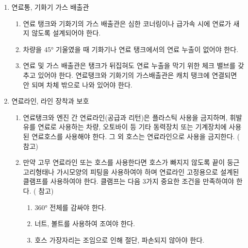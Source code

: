 \documentclass[final,a4paper,10pt]{report}
\begin{document}
\begin{enumerate}

  \item\label{rule:formula-technical.fuel-system.tank-and-carburetor-vent} 연료통, 기화기 가스 배출관
    \begin{enumerate}
      \item\label{rule:formula-technical.fuel-system.tank-and-carburetor-vent.leakproof-cornering-acceleration} 연료 탱크와 기화기의 가스 배출관은 심한 코너링이나 급가속 시에 연료가 새지 않도록 설계되어야 한다.
      \item\label{rule:formula-technical.fuel-system.tank-and-carburetor-vent.no-leak-45deg-tilt} 차량을 45° 기울였을 때 기화기나 연료 탱크에서의 연료 누출이 없어야 한다.
      \item\label{rule:formula-technical.fuel-system.tank-and-carburetor-vent.check-valve-and-routing} 연료 및 가스 배출관은 탱크가 뒤집혀도 연료 누출을 막기 위한 체크 밸브를 갖추고 있어야 한다. 연료탱크와 기화기의 가스배출관은 캐치 탱크에 연결되면 안 되며 차체 밖으로 나와 있어야 한다.
    \end{enumerate}

  \item\label{rule:formula-technical.fuel-system.fuel-lines} 연료라인, 라인 장착과 보호
    \begin{enumerate}
      \item\label{rule:formula-technical.fuel-system.fuel-lines.no-plastic-approved-hoses} 연료탱크와 엔진 간 연료라인(공급과 리턴)은 플라스틱 사용을 금지하며, 휘발유를 연료로 사용하는 차량, 오토바이 등 기타 동력장치 또는 기계장치에 사용된 연료호스를 사용해야 한다. 그 외 호스는 연료라인으로 사용을 금지한다. ( 참고)


      \item\label{rule:formula-technical.fuel-system.fuel-lines.rubber-hose-fitting-clamp} 만약 고무 연료라인 또는 호스를 사용한다면 호스가 빠지지 않도록 끝이 둥근 고리형태나 가시모양의 피팅을 사용하여야 하며 연료라인 고정용으로 설계된 클램프를 사용하여야 한다. 클램프는 다음 3가지 중요한 조건을 만족하여야 한다. ( 참고)
        \begin{enumerate}
          \item\label{rule:formula-technical.fuel-system.fuel-lines.rubber-hose-fitting-clamp.full-360deg-wrap} 360° 전체를 감싸야 한다.
          \item\label{rule:formula-technical.fuel-system.fuel-lines.rubber-hose-fitting-clamp.nut-and-bolt-tightening} 너트, 볼트를 사용하여 조여야 한다.
          \item\label{rule:formula-technical.fuel-system.fuel-lines.rubber-hose-fitting-clamp.no-hose-edge-damage} 호스 가장자리는 조임으로 인해 절단, 파손되지 않아야 한다.
        \end{enumerate}


\end{enumerate}
\end{enumerate}
\end{document}
